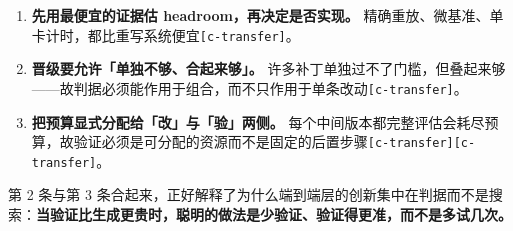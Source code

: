\begin{enumerate}
  \item \textbf{先用最便宜的证据估 headroom，再决定是否实现。} 精确重放、微基准、单卡计时，都比重写系统便宜{\scriptsize\texttt{[c-\hspace{0pt}transfer]}}。
  \item \textbf{晋级要允许「单独不够、合起来够」。} 许多补丁单独过不了门槛，但叠起来够——故判据必须能作用于组合，而不只作用于单条改动{\scriptsize\texttt{[c-\hspace{0pt}transfer]}}。
  \item \textbf{把预算显式分配给「改」与「验」两侧。} 每个中间版本都完整评估会耗尽预算，故验证必须是可分配的资源而不是固定的后置步骤{\scriptsize\texttt{[c-\hspace{0pt}transfer]}}{\scriptsize\texttt{[c-\hspace{0pt}transfer]}}。
\end{enumerate}

第 2 条与第 3 条合起来，正好解释了为什么端到端层的创新集中在判据而不是搜索：\textbf{当验证比生成更贵时，聪明的做法是少验证、验证得更准，而不是多试几次。}

